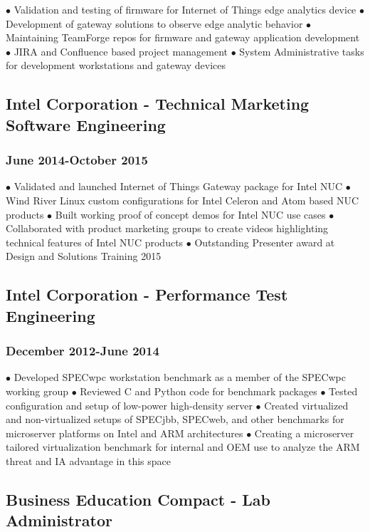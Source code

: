 \documentclass{article}
\begin{document}
$\bullet$ Validation and testing of firmware for Internet of Things edge analytics device
$\bullet$ Development of gateway solutions to observe edge analytic behavior
$\bullet$ Maintaining TeamForge repos for firmware and gateway application development
$\bullet$ JIRA and Confluence based project management
$\bullet$ System Administrative tasks for development workstations and gateway devices


\subsection*{Intel Corporation - Technical Marketing Software Engineering}
\subsubsection*{June 2014-October 2015}

$\bullet$ Validated and launched Internet of Things Gateway package for Intel NUC
$\bullet$ Wind River Linux custom configurations for Intel Celeron and Atom based NUC products
$\bullet$ Built working proof of concept demos for Intel NUC use cases 
$\bullet$ Collaborated with product marketing groups to create videos highlighting technical features of Intel NUC products
$\bullet$ Outstanding Presenter award at Design and Solutions Training 2015  


\subsection*{Intel Corporation - Performance Test Engineering}
\subsubsection*{December 2012-June 2014}

$\bullet$ Developed SPECwpc workstation benchmark as a member of the SPECwpc working group
$\bullet$ Reviewed C and Python code for benchmark packages
$\bullet$ Tested configuration and setup of low-power high-density server
$\bullet$ Created virtualized and non-virtualized setups of SPECjbb, SPECweb, and other benchmarks for microserver platforms on Intel and ARM architectures
$\bullet$ Creating a microserver tailored virtualization benchmark for internal and OEM use to analyze the ARM threat and IA advantage in this space

\subsection*{Business Education Compact - Lab Administrator}
\end{document}
